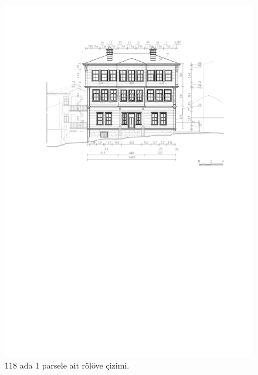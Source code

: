 \begin{figure}
\centering
\includegraphics[width=1\textwidth,height=\textheight]{source/figures/Roloveler/R118-1.pdf}
\caption{118 ada 1 parsele ait rölöve çizimi.}
\end{figure}

